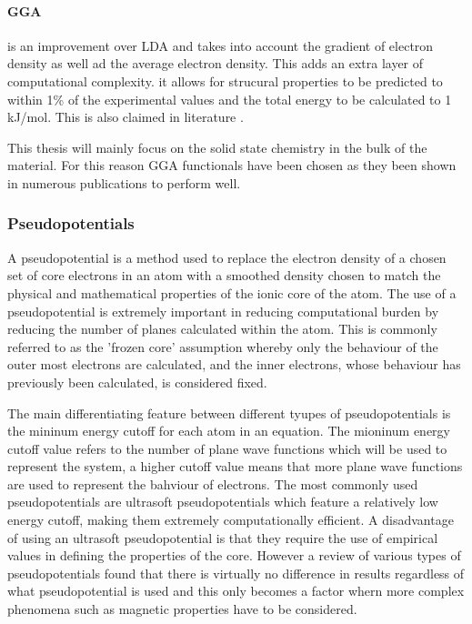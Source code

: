 \paragraph{GGA} is an improvement over LDA and takes into account the gradient of electron density as well ad the average electron density. This adds an extra layer of computational complexity. it allows for strucural properties to be predicted to within 1\% of the experimental values and the total energy to be calculated to 1 kJ/mol. \cite{dftbook1} This is also claimed in literature \cite{Olsen2003}.

This thesis will mainly focus on the solid state chemistry in the bulk of the material. For this reason GGA functionals have been chosen as they been shown in numerous publications to perform well. 

\subsubsection{Pseudopotentials}
A pseudopotential is a method used to replace the electron density of a chosen set of core electrons in an atom with a smoothed density chosen to match the physical and mathematical properties of the ionic core of the atom. \cite{dftbook1} The use of a pseudopotential is extremely important in reducing computational burden by reducing the number of planes calculated within the atom. This is commonly referred to as the 'frozen core' assumption whereby only the behaviour of the outer most electrons are calculated, and the inner electrons, whose behaviour has previously been calculated, is considered fixed. \cite{dftbook1}

The main differentiating feature between different tyupes of pseudopotentials is the mininum energy cutoff for each atom in an equation. The mioninum energy cutoff value refers to the number of plane wave functions which will be used to represent the system, a higher cutoff value means that more plane wave functions are used to represent the bahviour of electrons. The most commonly used pseudopotentials are ultrasoft pseudopotentials which feature a relatively low energy cutoff, making them extremely computationally efficient. A disadvantage of using an ultrasoft pseudopotential is that they require the use of empirical values in defining the properties of the core. However a review of various types of pseudopotentials found that there is virtually no difference in results regardless of what pseudopotential is used and this only becomes a factor whern more complex phenomena such as magnetic properties have to be considered. \cite{dftbook1}

